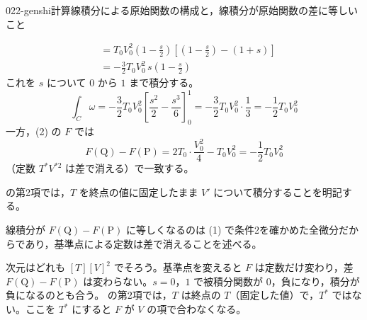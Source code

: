 \documentclass[uplatex,dvipdfmx,a4paper,11pt]{jsarticle}
\begin{document}
\begin{mondai}{022-genshi}{計算}{線積分による原始関数の構成と，線積分が原始関数の差に等しいこと}
\begin{tadashii}
\begin{align*}
&= T_{0}V_{0}^{2}\left(1 - \frac{s}{2}\right)\left[\left(1 - \frac{s}{2}\right) - (1+s)\right]\\
&= -\frac{3}{2}T_{0}V_{0}^{2}\,s\left(1 - \frac{s}{2}\right)
\end{align*}
これを $s$ について $0$ から $1$ まで積分する。
\[ \int_{C}\omega = -\frac{3}{2}T_{0}V_{0}^{2}\left[\frac{s^{2}}{2} - \frac{s^{3}}{6}\right]_{0}^{1} = -\frac{3}{2}T_{0}V_{0}^{2}\cdot\frac{1}{3} = -\frac{1}{2}T_{0}V_{0}^{2} \]
一方，(2) の $F$ では
\[ F(\mathrm{Q}) - F(\mathrm{P}) = 2T_{0}\cdot\frac{V_{0}^{2}}{4} - T_{0}V_{0}^{2} = -\frac{1}{2}T_{0}V_{0}^{2} \]
（定数 $T^{*}V^{*2}$ は差で消える）で一致する。
\begin{ronten}
  \item {}  の第2項では，$T$ を終点の値に固定したまま $V'$ について積分することを明記する。
  \item {} 線積分が $F(\mathrm{Q}) - F(\mathrm{P})$ に等しくなるのは (1) で条件2を確かめた全微分だからであり，基準点による定数は差で消えることを述べる。
\end{ronten}
\kenzan 次元はどれも $[T][V]^{2}$ でそろう。基準点を変えると $F$ は定数だけ変わり，差 $F(\mathrm{Q}) - F(\mathrm{P})$ は変わらない。$s = 0$，$1$ で被積分関数が $0$，負になり，積分が負になるのとも合う。
\tsumazuki {} の第2項では，$T$ は終点の $T$（固定した値）で，$T^{*}$ ではない。ここを $T^{*}$ にすると $F$ が $V$ の項で合わなくなる。
\end{tadashii}
\end{mondai}

\noteowari
\end{document}
